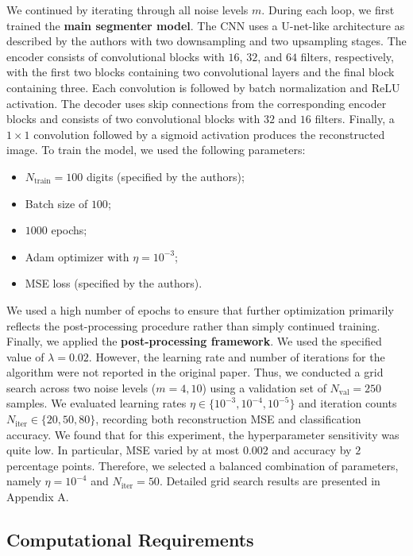 We continued by iterating through all noise levels $m$. During each loop, we first trained the \textbf{ main segmenter model}. The CNN uses a U-net-like architecture as described by the authors with two downsampling and two upsampling stages. The encoder consists of convolutional blocks with $16$, $32$, and $64$ filters, respectively, with the first two blocks containing two convolutional layers and the final block containing three. Each convolution is followed by batch normalization and ReLU activation. The decoder uses skip connections from the corresponding encoder blocks and consists of two convolutional blocks with $32$ and $16$ filters. Finally, a $1\times1$ convolution followed by a sigmoid activation produces the reconstructed image. To train the model, we used the following parameters:
\begin{itemize}
  \item $N_\text{train}=100$ digits (specified by the authors);
  \item Batch size of $100$;
  \item $1000$ epochs;
  \item Adam optimizer with $\eta=10^{-3}$;
  \item MSE loss (specified by the authors).
\end{itemize}
We used a high number of epochs to ensure that further optimization primarily reflects the post-processing procedure rather than simply continued training. \\

Finally, we applied the \textbf{post-processing framework}. We used the specified value of $\lambda=0.02$. However, the learning rate and number of iterations for the algorithm were not reported in the original paper. Thus, we conducted a grid search across two noise levels ($m=4, 10$) using a validation set of $N_{\text{val}}=250$ samples. We evaluated learning rates $\eta \in \{ 10^{-3}, 10^{-4}, 10^{-5} \}$ and iteration counts $N_\text{iter} \in \{ 20, 50, 80 \}$, recording both reconstruction MSE and classification accuracy. We found that for this experiment, the hyperparameter sensitivity was quite low. In particular, MSE varied by at most $0.002$ and accuracy by $2$ percentage points. Therefore, we selected a balanced combination of parameters, namely $\eta = 10^{-4}$ and $N_\text{iter} = 50$. Detailed grid search results are presented in Appendix A.

\subsection{Computational Requirements}

